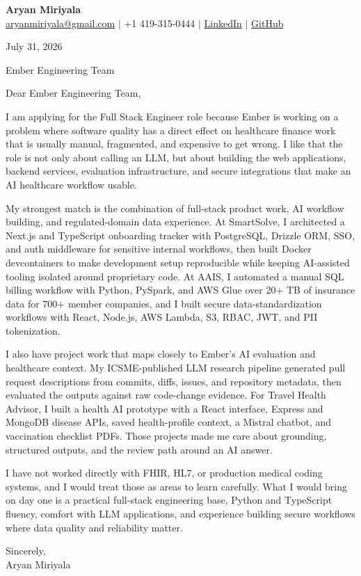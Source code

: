 \documentclass[letterpaper,11pt]{article}
\begin{document}
{\Large\textbf{Aryan Miriyala}}\\
\href{mailto:aryanmiriyala@gmail.com}{aryanmiriyala@gmail.com} $|$ +1 419-315-0444 $|$
\href{https://www.linkedin.com/in/aryan-miriyala-7788a21b6/}{LinkedIn} $|$
\href{https://github.com/aryanmiriyala}{GitHub}

July 31, 2026

Ember Engineering Team

Dear Ember Engineering Team,

I am applying for the Full Stack Engineer role because Ember is working on a problem where software quality has a direct effect on healthcare finance work that is usually manual, fragmented, and expensive to get wrong. I like that the role is not only about calling an LLM, but about building the web applications, backend services, evaluation infrastructure, and secure integrations that make an AI healthcare workflow usable.

My strongest match is the combination of full-stack product work, AI workflow building, and regulated-domain data experience. At SmartSolve, I architected a Next.js and TypeScript onboarding tracker with PostgreSQL, Drizzle ORM, SSO, and auth middleware for sensitive internal workflows, then built Docker devcontainers to make development setup reproducible while keeping AI-assisted tooling isolated around proprietary code. At AAIS, I automated a manual SQL billing workflow with Python, PySpark, and AWS Glue over 20+ TB of insurance data for 700+ member companies, and I built secure data-standardization workflows with React, Node.js, AWS Lambda, S3, RBAC, JWT, and PII tokenization.

I also have project work that maps closely to Ember's AI evaluation and healthcare context. My ICSME-published LLM research pipeline generated pull request descriptions from commits, diffs, issues, and repository metadata, then evaluated the outputs against raw code-change evidence. For Travel Health Advisor, I built a health AI prototype with a React interface, Express and MongoDB disease APIs, saved health-profile context, a Mistral chatbot, and vaccination checklist PDFs. Those projects made me care about grounding, structured outputs, and the review path around an AI answer.

I have not worked directly with FHIR, HL7, or production medical coding systems, and I would treat those as areas to learn carefully. What I would bring on day one is a practical full-stack engineering base, Python and TypeScript fluency, comfort with LLM applications, and experience building secure workflows where data quality and reliability matter.

Sincerely,\\
Aryan Miriyala
\end{document}
